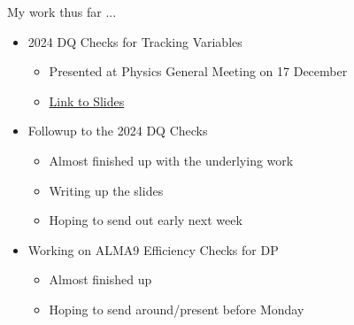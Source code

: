 
\begin{frame}{My work thus far ...}
    \begin{itemize}
        \item 2024 DQ Checks for Tracking Variables
        \begin{itemize}
            \item Presented at Physics General Meeting on 17 December 
            \item \href{https://indico.cern.ch/event/1488927/contributions/6275978/attachments/2988614/5264126/main.pdf}{Link to Slides}
        \end{itemize}
        \item Followup to the 2024 DQ Checks
        \begin{itemize}
            \item Almost finished up with the underlying work 
            \item Writing up the slides
            \item Hoping to send out early next week
        \end{itemize}
        \item Working on ALMA9 Efficiency Checks for DP
        \begin{itemize}
            \item Almost finished up 
            \item Hoping to send around/present before Monday
        \end{itemize}
    \end{itemize}
\end{frame}


